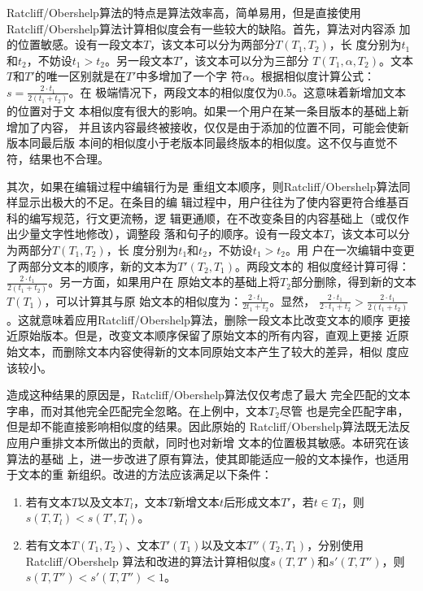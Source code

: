 Ratcliff/Obershelp算法的特点是算法效率高，简单易用，但是直接使用
Ratcliff/Obershelp算法计算相似度会有一些较大的缺陷。首先，算法对内容添
加的位置敏感。设有一段文本$T$，该文本可以分为两部分$T(T_1,T_2)$，长
度分别为$t_1$和$t_2$，不妨设$t_1>t_2$。另一段文本$T'$，该文本可以分为三部分
$T(T_1,\alpha,T_2)$。文本$T$和$T'$的唯一区别就是在$T'$中多增加了一个字
符$\alpha$。根据相似度计算公式：$s=\frac{2 \cdot t_1}{2(t_1+t_2)}$。在
极端情况下，两段文本的相似度仅为$0.5$。这意味着新增加文本的位置对于文
本相似度有很大的影响。如果一个用户在某一条目版本的基础上新增加了内容，
并且该内容最终被接收，仅仅是由于添加的位置不同，可能会使新版本同最后版
本间的相似度小于老版本同最终版本的相似度。这不仅与直觉不符，结果也不合理。

其次，如果在编辑过程中编辑行为是
重组文本顺序，则Ratcliff/Obershelp算法同样显示出极大的不足。在条目的编
辑过程中，用户往往为了使内容更符合维基百科的编写规范，行文更流畅，逻
辑更通顺，在不改变条目的内容基础上（或仅作出少量文字性地修改），调整段
落和句子的顺序。设有一段文本$T$，该文本可以分为两部分$T(T_1,T_2)$，长
度分别为$t_1$和$t_2$，不妨设$t_1>t_2$。用
户在一次编辑中变更了两部分文本的顺序，新的文本为$T'(T_2,T_1)$。两段文本的
相似度经计算可得：$\frac{2 \cdot t_1}{2(t_1+t_2)}$。另一方面，如果用户在
原始文本的基础上将$T_2$部分删除，得到新的文本$T(T_1)$，可以计算其与原
始文本的相似度为：$\frac{2 \cdot t_1}{2t_1+t_2}$。显然，
$
\frac{2 \cdot t_1}{2 \cdot t_1+t_2}>\frac{2 \cdot t_1}{2(t_1+t_2)}
$。这就意味着应用Ratcliff/Obershelp算法，删除一段文本比改变文本的顺序
更接近原始版本。但是，改变文本顺序保留了原始文本的所有内容，直观上更接
近原始文本，而删除文本内容使得新的文本同原始文本产生了较大的差异，相似
度应该较小。

造成这种结果的原因是，Ratcliff/Obershelp算法仅仅考虑了最大
完全匹配的文本字串，而对其他完全匹配完全忽略。在上例中，文本$T_2$尽管
也是完全匹配字串，但是却不能直接影响相似度的结果。因此原始的
Ratcliff/Obershelp算法既无法反应用户重排文本所做出的贡献，同时也对新增
文本的位置极其敏感。本研究在该算法的基础
上，进一步改进了原有算法，使其即能适应一般的文本操作，也适用于文本的重
新组织。改进的方法应该满足以下条件：
\begin{enumerate}
\item 若有文本$T$以及文本$T_l$，文本$T$新增文本$t$后形成文本$T'$，若$t
  \in T_l$，则$s(T,T_l)<s(T',T_l)$。
\item 若有文本$T(T_1,T_2)$、文本$T'(T_1)$以及文本$T''(T_2,T_1)$，分别使用Ratcliff/Obershelp
  算法和改进的算法计算相似度$s(T,T')$和$s'(T,T'')$，则$s(T,T'')<s'(T,T'')<1$。
\end{enumerate}

